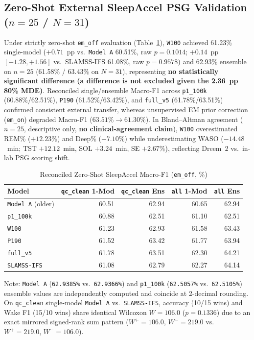 \documentclass[journal]{IEEEtran}
\begin{document}
\subsection{Zero-Shot External SleepAccel PSG Validation ($n=25$ / $N=31$)}
Under strictly zero-shot \texttt{em\_off} evaluation (Table~\ref{tab:sleepaccel}), \texttt{W100} achieved 61.23\% single-model ($+0.71$~pp vs.\ \texttt{Model~A} 60.51\%, raw $p=0.1014$; $+0.14$~pp $[-1.28, +1.56]$ vs.\ SLAMSS-IFS 61.08\%, raw $p=0.9578$) and 62.93\% ensemble on $n=25$ (61.58\% / 63.43\% on $N=31$), representing \textbf{no statistically significant difference (a difference is not excluded given the 2.36~pp 80\% MDE)}. Reconciled single/ensemble Macro-F1 across \texttt{p1\_100k} (60.88\%/62.51\%), \texttt{P190} (61.52\%/63.42\%), and \texttt{full\_v5} (61.78\%/63.51\%) confirmed consistent external transfer, whereas unsupervised EM prior correction (\texttt{em\_on}) degraded Macro-F1 ($63.51\% \rightarrow 61.30\%$). In Bland--Altman agreement ($n=25$, descriptive only, \textbf{no clinical-agreement claim}), \texttt{W100} overestimated REM\% ($+12.23\%$) and Deep\% ($+7.10\%$) while underestimating WASO ($-14.48$~min; TST $+12.12$~min, SOL $+3.24$~min, SE $+2.67\%$), reflecting Dreem~2 vs.\ in-lab PSG scoring shift.

\begin{table}[!t]
\centering
\caption{Reconciled Zero-Shot SleepAccel Macro-F1 (\texttt{em\_off}, \%)}
\label{tab:sleepaccel}
\scriptsize
\begin{tabular}{@{}lrrrr@{}}
\toprule
Model & \texttt{qc\_clean} 1-Mod & \texttt{qc\_clean} Ens & \texttt{all} 1-Mod & \texttt{all} Ens \\
\midrule
\texttt{Model A} (older) & 60.51 & 62.94 & 60.65 & 62.94 \\
\texttt{p1\_100k} & 60.88 & 62.51 & 61.10 & 62.51 \\
\texttt{W100} & 61.23 & 62.93 & 61.58 & 63.43 \\
\texttt{P190} & 61.52 & 63.42 & 61.77 & 63.94 \\
\texttt{full\_v5} & 61.78 & 63.51 & 62.30 & 64.21 \\
\texttt{SLAMSS-IFS} & 61.08 & 62.79 & 62.27 & 64.14 \\
\bottomrule
\end{tabular}
\par\vspace{0.2em}\raggedright\scriptsize Note: \texttt{Model A} (\texttt{62.9385\%} vs.\ \texttt{62.9366\%}) and \texttt{p1\_100k} (\texttt{62.5057\%} vs.\ \texttt{62.5105\%}) ensemble values are independently computed and coincide at 2-decimal rounding. On \texttt{qc\_clean} single-model \texttt{Model A} vs.\ \texttt{SLAMSS-IFS}, accuracy (10/15 wins) and Wake F1 (15/10 wins) share identical Wilcoxon $W=106.0$ ($p=0.1336$) due to an exact mirrored signed-rank sum pattern ($W^+=106.0$, $W^-=219.0$ vs.\ $W^+=219.0$, $W^-=106.0$).
\end{table}
\end{document}
